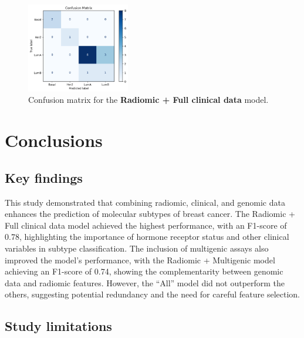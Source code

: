 \documentclass[conference]{IEEEtran}
\begin{document}
\begin{figure}[H]
    \centering
    \includegraphics[width=0.4\textwidth]{images/confusion_matrix.png}
    \caption{Confusion matrix for the \textbf{Radiomic + Full clinical data} model.}
    \label{fig:confusion_matrix}
\end{figure}


 
\section{Conclusions}

\subsection{Key findings}

This study demonstrated that combining radiomic, clinical, and genomic data enhances the prediction of molecular subtypes of breast cancer. The Radiomic + Full clinical data model achieved the highest performance, with an F1-score of 0.78, highlighting the importance of hormone receptor status and other clinical variables in subtype classification. The inclusion of multigenic assays also improved the model’s performance, with the Radiomic + Multigenic model achieving an F1-score of 0.74, showing the complementarity between genomic data and radiomic features. However, the ``All'' model did not outperform the others, suggesting potential redundancy and the need for careful feature selection.

\subsection{Study limitations}
\end{document}
